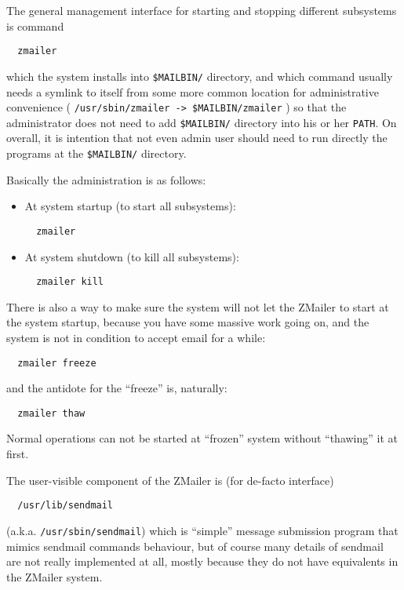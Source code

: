 The general management interface for starting and stopping different
subsystems is command
\begin{verbatim}
  zmailer
\end{verbatim}

which the system installs into {\tt \$MAILBIN/} directory, and which command
usually needs a symlink to itself from some more common location for
administrative convenience
( {\tt /usr/sbin/zmailer -> \$MAILBIN/zmailer} )
so that the administrator does not need to add  {\tt \$MAILBIN/}  directory
into his or her {\tt PATH}.   On overall, it is intention that not even 
admin user should need to run directly the programs at the {\tt \$MAILBIN/}
directory.

Basically the administration is as follows:
\begin{itemize}
\item
At system startup (to start all subsystems):
\begin{verbatim}
  zmailer
\end{verbatim}
\item
At system shutdown (to kill all subsystems):
\begin{verbatim}
  zmailer kill
\end{verbatim}
\end{itemize}

There is also a way to make sure the system will not let the ZMailer
to start at the system startup, because you have some massive work
going on, and the system is not in condition to accept email for a while: 
\nopagebreak
\begin{verbatim}
  zmailer freeze
\end{verbatim}

and the antidote for the ``freeze'' is, naturally:
\nopagebreak
\begin{verbatim}
  zmailer thaw
\end{verbatim}

Normal operations can not be started at ``frozen'' system without
``thawing'' it at first.

The user-visible component of the ZMailer is (for de-facto interface)
\begin{verbatim}
  /usr/lib/sendmail
\end{verbatim}
(a.k.a. {\tt /usr/sbin/sendmail})
which is ``simple'' message submission program that mimics sendmail
commands behaviour, but of course many details of sendmail are
not really implemented at all, mostly because they do not have
equivalents in the ZMailer system.

